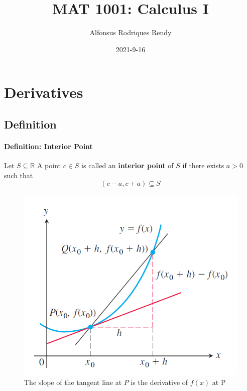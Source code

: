 \documentclass[12pt]{article}
\title{MAT 1001: Calculus I}
\author{Alfonsus Rodriques Rendy}
\date{2021-9-16}
\begin{document}
\begin{center}
    \hspace*{-0.5cm}
\end{center}

\section{Derivatives}
\subsection{Definition}
\paragraph{Definition: Interior Point} Let $S \subseteq \mathbb{R}$ A point $c \in S$ is called an \textbf{interior point} of $S$ 
if there exists $a > 0$ such that
\[
    (c - a, c + a) \subseteq S
\]

\begin{figure}[h!]
    \centering
    \includegraphics[width = 0.45\linewidth]{Images/derivative.png}
    \caption{The slope of the tangent line at $P$ is the derivative of $f(x)$ at P}
\end{figure}
\end{document}
